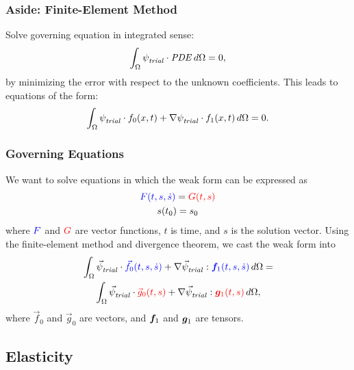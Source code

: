 \documentclass[aspectratio=169]{beamer}
\begin{document}
  
\begin{frame}
  \frametitle{Aside: Finite-Element Method}

  Solve governing equation in integrated sense:
  \begin{equation}
    \int_\Omega {\psi_\mathit{trial}^{}} \cdot \mathit{PDE} \, d\Omega = 0,
  \end{equation}
  by minimizing the error with respect to the unknown coefficients.
  \vfill
  This leads to equations of the form:
  \begin{equation}
    \int_\Omega {\psi_\mathit{trial}^{}} \cdot f_0(x,t) + \nabla {\psi_\mathit{trial}^{}} \cdot f_1(x,t) \, d\Omega = 0.
  \end{equation}

\end{frame}

\begin{frame}
  \frametitle{Governing Equations}
  \summary{}

  We want to solve equations in which the weak form can be expressed
  as
  \begin{gather}
    {\color{blue}F(t,s,\dot{s})} = {\color{red}G(t,s)} \\
    s(t_0) = s_0
  \end{gather}
  where ${\color{blue}F}$ and ${\color{red}G}$ are vector functions, $t$ is time, and $s$ is the solution vector.
  \vfill
  Using the finite-element method and divergence theorem, we cast the weak form into
  \begin{multline}
    \int_\Omega {\vec{\psi}_\mathit{trial}^{}} \cdot {\color{blue}\vec{f}_0(t,s,\dot{s})} + \nabla {\vec{\psi}_\mathit{trial}^{}} : {\color{blue}\bm{f}
    _1(t,s,\dot{s})} \, 
    d\Omega = \\
    \int_\Omega {\vec{\psi}_\mathit{trial}^{}} \cdot {\color{red}\vec{g}_0(t,s)} + \nabla {\vec{\psi}_\mathit{trial}^{}} : {\color{red}\bm{g}_1(t,s)} \, 
    d\Omega,
  \end{multline}
  where $\vec{f}_0$ and $\vec{g}_0$ are vectors, and $\bm{f}_1$ and
  $\bm{g}_1$ are tensors.

\end{frame}

\subsection{Elasticity}
\end{document}
